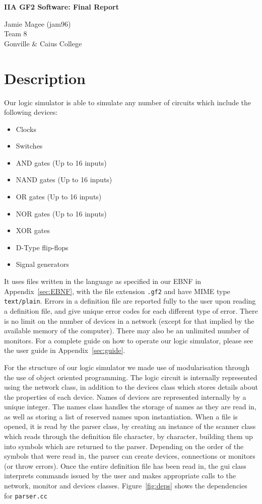 \documentclass[a4paper,10pt]{article}
\begin{document}
\begin{center}
\Huge \textbf{IIA GF2 Software: Final Report}

\large Jamie Magee (jam96) \\ Team 8 \\ Gonville \& Caius College
\end{center}

\tableofcontents
\pagebreak

\section{Description}
Our logic simulator is able to simulate any number of circuits which include the following devices:

\begin{itemize}
\item Clocks
\item Switches
\item AND gates (Up to 16 inputs)
\item NAND gates (Up to 16 inputs)
\item OR gates (Up to 16 inputs)
\item NOR gates (Up to 16 inputs)
\item XOR gates
\item D-Type flip-flops
\item Signal generators
\end{itemize}

It uses files written in the language as specified in our EBNF in Appendix~\ref{sec:EBNF}, with the file extension \texttt{.gf2} and have MIME type \texttt{text/plain}. Errors in a definition file are reported fully to the user upon reading a definition file, and give unique error codes for each different type of error. There is no limit on the number of devices in a network (except for that implied by the available memory of the computer). There may also be an unlimited number of monitors. For a complete guide on how to operate our logic simulator, please see the user guide in Appendix~\ref{sec:guide}.

For the structure of our logic simulator we made use of modularisation through the use of object oriented programming. The logic circuit is internally represented using the network class, in addition to the devices class which stores details about the properties of each device. Names of devices are represented internally by a unique integer. The names class handles the storage of names as they are read in, as well as storing a list of reserved names upon instantiation. When a file is opened, it is read by the parser class, by creating an instance of the scanner class which reads through the definition file character, by character, building them up into symbols which are returned to the parser. Depending on the order of the symbols that were read in, the parser can create devices, connections or monitors (or throw errors). Once the entire definition file has been read in, the gui class interprets commands issued by the user and makes appropriate calls to the network, monitor and devices classes. Figure~\ref{fig:deps} shows the dependencies for \texttt{parser.cc}
\end{document}
